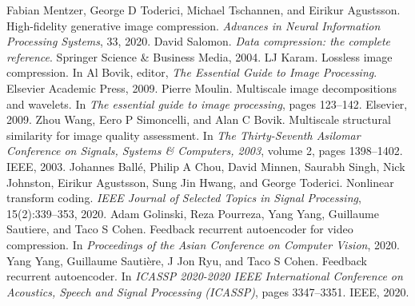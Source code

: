 \begin{chapterreferences}
 Fabian Mentzer, George D Toderici, Michael Tschannen, and Eirikur Agustsson. High-fidelity generative image compression. \emph{Advances in Neural Information Processing Systems}, 33, 2020.
 David Salomon. \emph{Data compression: the complete reference}. Springer Science \& Business Media, 2004.
 LJ Karam. Lossless image compression. In Al Bovik, editor, \emph{The Essential Guide to Image Processing}. Elsevier Academic Press, 2009.
 Pierre Moulin. Multiscale image decompositions and wavelets. In \emph{The essential guide to image processing}, pages 123–142. Elsevier, 2009.
 Zhou Wang, Eero P Simoncelli, and Alan C Bovik. Multiscale structural similarity for image quality assessment. In \emph{The Thirty-Seventh Asilomar Conference on Signals, Systems \& Computers, 2003}, volume 2, pages 1398–1402. IEEE, 2003.
 Johannes Ballé, Philip A Chou, David Minnen, Saurabh Singh, Nick Johnston, Eirikur Agustsson, Sung Jin Hwang, and George Toderici. Nonlinear transform coding. \emph{IEEE Journal of Selected Topics in Signal Processing}, 15(2):339–353, 2020.
 Adam Golinski, Reza Pourreza, Yang Yang, Guillaume Sautiere, and Taco S Cohen. Feedback recurrent autoencoder for video compression. In \emph{Proceedings of the Asian Conference on Computer Vision}, 2020.
 Yang Yang, Guillaume Sautière, J Jon Ryu, and Taco S Cohen. Feedback recurrent autoencoder. In \emph{ICASSP 2020-2020 IEEE International Conference on Acoustics, Speech and Signal Processing (ICASSP)}, pages 3347–3351. IEEE, 2020.
\end{chapterreferences}

